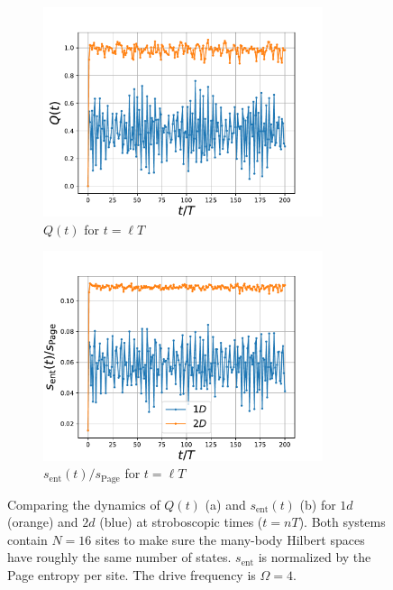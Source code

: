 \documentclass{SciPost}
\newcommand\0{\scalebox{-1}[1]{0}}
\begin{document}
\begin{figure}[t!]
	\begin{subfigure}[b]{0.496\textwidth}
		\includegraphics[width=0.9\textwidth]{TFIM_Q.pdf}
		\caption{$Q(t)$ for $t=\ell T$}
	\end{subfigure}
	\begin{subfigure}[b]{0.496\textwidth}
		\includegraphics[width=0.9\textwidth]{TFIM_S.pdf}
		\caption{$s_\mathrm{ent}(t)/s_\mathrm{Page}$ for $t=\ell T$}
	\end{subfigure}
	\caption{\label{fig:example9} Comparing the dynamics of $Q(t)$ (a) and $s_\mathrm{ent}(t)$ (b) for $1d$ (orange) and $2d$ (blue) at stroboscopic times ($t=nT$). Both systems contain $N=16$ sites to make sure the many-body Hilbert spaces have roughly the same number of states. $s_\mathrm{ent}$ is normalized by the Page entropy per site. The drive frequency is $\Omega=4$.}
\end{figure}
\end{document}
